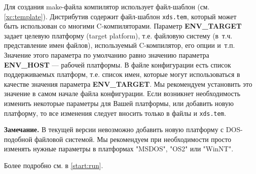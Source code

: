 Для создания make-файла компилятор использует
файл-шаблон (см. \ref{xc:template}).
Дистрибутив \XDS{} содержит файл-шаблон {\tt xds.tem}, который
может быть использован со многими C-компиляторами.
Параметр {\bf ENV\_TARGET} задает целевую платформу (target platform), 
т.е. файловую систему (в~т.ч. представление имен файлов), используемый
C-компилятор, его опции и~т.п. Значение этого параметра по умолчанию
равно значению параметра {\bf ENV\_HOST} --- рабочей платформы.
В файле конфигурации {\tt \cfg} есть список поддерживаемых платформ,
т.е. список имен, которые могут использоваться в качестве значения
параметра {\bf ENV\_TARGET}. Мы рекомендуем установить это значение 
в самом начале файла конфигурации. Если возникнет необходимость
изменить некоторые параметры для Вашей платформы, или добавить новую
платформу, то все изменения следует вносить только в файлы
{\tt \cfg} и {\tt xds.tem}.

{\bf Замечание.} В текущей версии невозможно добавить новую
платформу с 
DOS-подобной файловой системой. Мы рекомендуем при необходимости
просто изменять нужные параметры в платформах
"MSDOS", "OS2" или "WinNT".

Более подробно см. в \ref{start:run}.

\fi  %
